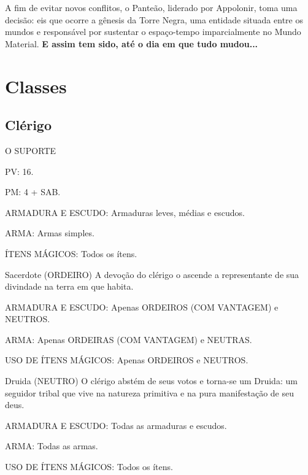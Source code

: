 \documentclass[10pt,twoside,twocolumn]{book}
\begin{document}
A fim de evitar novos conflitos, o Panteão, liderado por Appolonir, toma uma decisão: eis que ocorre a gênesis da Torre Negra, uma entidade situada entre os mundos e responsável por sustentar o espaço-tempo imparcialmente no Mundo Material. \textbf{ E assim tem sido, até o dia em que tudo mudou...}


\section{Classes}

\subsection{Clérigo}
  \begin{rpg-quotebox}{O SUPORTE}
      \begin{rpg-list}
       \item PV: 16.
       \item PM: 4 + SAB.
       \item ARMADURA E ESCUDO: Armaduras leves, médias e escudos.
       \item ARMA: Armas simples.
       \item ÍTENS MÁGICOS: Todos os ítens.
  \end{rpg-list}
  	
\end{rpg-quotebox}

\begin{rpg-suggestionbox}{Sacerdote (ORDEIRO)}
  A devoção do clérigo o ascende a representante de sua divindade na terra em que habita. 
  \begin{rpg-list}
       \item ARMADURA E ESCUDO: Apenas ORDEIROS (COM VANTAGEM) e NEUTROS.
       \item ARMA: Apenas ORDEIRAS (COM VANTAGEM) e NEUTRAS.
       \item USO DE ÍTENS MÁGICOS: Apenas ORDEIROS e NEUTROS.
  \end{rpg-list}    
\end{rpg-suggestionbox}

\begin{rpg-commentbox}{Druida (NEUTRO)}
	O clérigo abstém de seus votos e torna-se um Druida: um seguidor tribal que vive na natureza primitiva e na pura manifestação de seu deus. 
    \begin{rpg-list}
      	\item ARMADURA E ESCUDO: Todas as armaduras e escudos.
    	\item ARMA: Todas as armas.
    	\item USO DE ÍTENS MÁGICOS: Todos os ítens.
    \end{rpg-list}
\end{rpg-commentbox}
\end{document}
